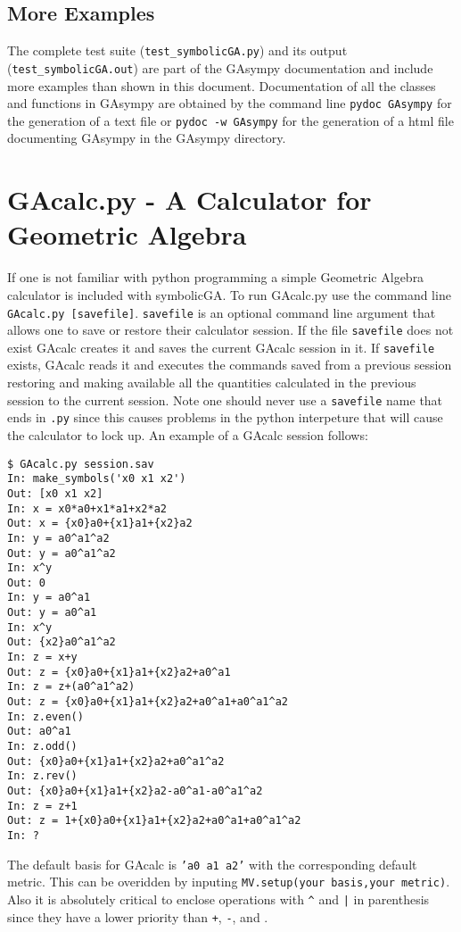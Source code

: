 \documentclass{article}
\begin{document}
\subsection{More Examples}
The complete test suite ({\tt test\_symbolicGA.py}) and its output ({\tt test\_symbolicGA.out}) are part of the
GAsympy documentation and include more examples than shown in this document.  Documentation of all the classes
and functions in GAsympy are obtained by the command line {\tt pydoc GAsympy} for the generation of a text 
file or {\tt pydoc -w GAsympy} for the generation of a html file documenting GAsympy in the GAsympy directory.

\section{GAcalc.py - A Calculator for Geometric Algebra}
If one is not familiar with python programming a simple Geometric Algebra calculator is included with symbolicGA.  To run GAcalc.py use the command line {\tt GAcalc.py [savefile]}.  {\tt savefile} is an optional command line argument that
allows one to save or restore their calculator session.  If the file {\tt savefile} does not exist GAcalc 
creates it and saves the
current GAcalc session in it.  If {\tt savefile} exists, GAcalc reads it and executes the commands saved from a previous
session restoring and making available all the quantities calculated in the previous session to the current session. Note 
one should never use a {\tt savefile} name that ends in {\tt .py} since this causes problems in the python interpeture
that will cause the calculator to lock up.  An example of a GAcalc session follows:

\begin{verbatim}
$ GAcalc.py session.sav
In: make_symbols('x0 x1 x2')
Out: [x0 x1 x2]
In: x = x0*a0+x1*a1+x2*a2
Out: x = {x0}a0+{x1}a1+{x2}a2
In: y = a0^a1^a2
Out: y = a0^a1^a2
In: x^y
Out: 0
In: y = a0^a1
Out: y = a0^a1
In: x^y
Out: {x2}a0^a1^a2
In: z = x+y
Out: z = {x0}a0+{x1}a1+{x2}a2+a0^a1
In: z = z+(a0^a1^a2)
Out: z = {x0}a0+{x1}a1+{x2}a2+a0^a1+a0^a1^a2
In: z.even()
Out: a0^a1
In: z.odd()
Out: {x0}a0+{x1}a1+{x2}a2+a0^a1^a2
In: z.rev()
Out: {x0}a0+{x1}a1+{x2}a2-a0^a1-a0^a1^a2
In: z = z+1
Out: z = 1+{x0}a0+{x1}a1+{x2}a2+a0^a1+a0^a1^a2
In: ?
\end{verbatim}

The default basis for GAcalc is {\tt 'a0 a1 a2'} with the corresponding default metric. This can be
overidden by inputing {\tt MV.setup(your basis,your metric)}. Also it is absolutely critical to enclose
operations with \verb!^! and {\tt |} in parenthesis since they have a lower priority than {\tt +}, 
{\tt -}, and {\tt *}.
\end{document}
